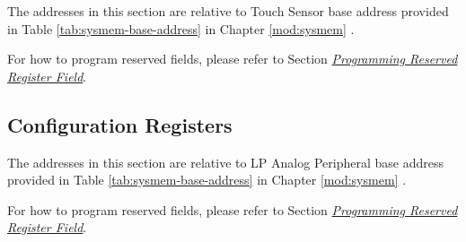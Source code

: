 \documentclass[main\_\_EN.tex]{subfiles}
\begin{document}
The addresses in this section are relative to Touch Sensor base address provided in Table \ref{tab:sysmem-base-address} in Chapter \ref{mod:sysmem} \textit{}.

For how to program reserved fields, please refer to Section \hyperref[programming-reserved-field]{\textit{Programming Reserved Register Field}}.



\subsection{Configuration Registers}
\label{sec:tchsen-config-reg}

The addresses in this section are relative to LP Analog Peripheral base address provided in Table \ref{tab:sysmem-base-address} in Chapter \ref{mod:sysmem} \textit{}.

For how to program reserved fields, please refer to Section \hyperref[programming-reserved-field]{\textit{Programming Reserved Register Field}}.


\end{document}
